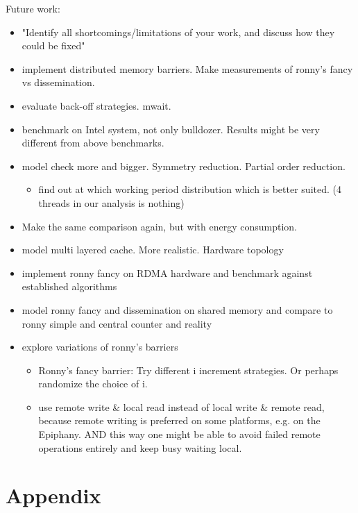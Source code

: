 \documentclass[a4paper, 10pt]{article}
\begin{document}
Future work:
\begin{itemize}
	\item "Identify all shortcomings/limitations of your work, and discuss how they could be fixed"
	\item implement distributed memory barriers. Make measurements of ronny's fancy vs dissemination.
	\item evaluate back-off strategies. mwait.
	\item benchmark on Intel system, not only bulldozer. Results might be very different from above benchmarks.
	\item model check more and bigger. Symmetry reduction. Partial order reduction.
		\begin{itemize}
			\item find out at which working period distribution which is better suited. (4 threads in our analysis is nothing)
		\end{itemize}
	\item Make the same comparison again, but with energy consumption.
	\item model multi layered cache. More realistic. Hardware topology
	\item implement ronny fancy on RDMA hardware and benchmark against established algorithms
	\item model ronny fancy and dissemination on shared memory and compare to ronny simple and central counter and reality
	\item explore variations of ronny's barriers
		\begin{itemize}
			\item Ronny's fancy barrier: Try different i increment strategies. Or perhaps randomize the choice of i.
			\item use remote write \& local read instead of local write \& remote read, because remote writing is preferred on some platforms, e.g. on the Epiphany\cite{epiphany}. AND this way one might be able to avoid failed remote operations entirely and keep busy waiting local.
		\end{itemize}
\end{itemize}


\appendix

\pagebreak
\section{Appendix}
\label{sec:appendix}
\end{document}

